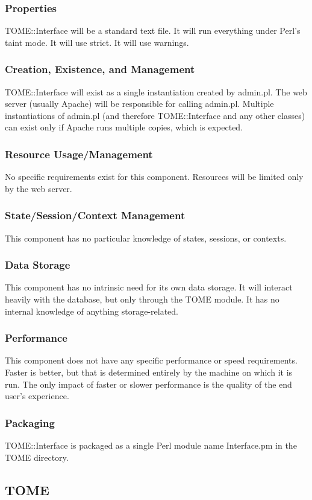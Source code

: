 \documentclass[12pt,titlepage]{article}
\begin{document}
\subsubsection{Properties}
TOME::Interface will be a standard text file.  It will run everything under Perl's taint mode.  It will use strict.  It will use warnings. 
\subsubsection{Creation, Existence, and Management}
TOME::Interface will exist as a single instantiation created by admin.pl.  The web server (usually Apache) will be responsible for calling admin.pl.  Multiple instantiations of admin.pl (and therefore TOME::Interface and any other classes) can exist only if Apache runs multiple copies, which is expected.
\subsubsection{Resource Usage/Management}
No specific requirements exist for this component.  Resources will be limited only by the web server.
\subsubsection{State/Session/Context Management}
This component has no particular knowledge of states, sessions, or contexts.
\subsubsection{Data Storage}
This component has no intrinsic need for its own data storage.  It will interact heavily with the database, but only through the TOME module.  It has no internal knowledge of anything storage-related.
\subsubsection{Performance}
This component does not have any specific performance or speed requirements.  Faster is better, but that is determined entirely by the machine on which it is run.  The only impact of faster or slower performance is the quality of the end user's experience.
\subsubsection{Packaging}
TOME::Interface is packaged as a single Perl module name Interface.pm in the TOME directory.


\subsection{TOME}
\end{document}
